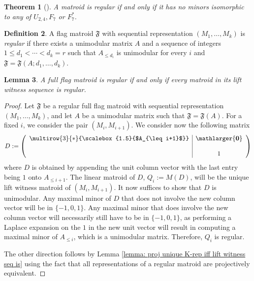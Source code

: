 \documentclass[12pt]{article}
\newtheorem{thm}{Theorem}[section]
\newtheorem{lemma}[thm]{Lemma}
\theoremstyle{definition}
\newtheorem{defn}[thm]{Definition}
\begin{document}
\begin{thm}[{\cite[Theorem~6.6.6]{oxley}}]\label{thm: forbidden minors regularity}
    A matroid is regular if and only if it has no minors isomorphic to any of $U_{2,4}, F_7$ or $F_7^*$.
\end{thm}


\begin{defn}
     A flag matroid $\mathfrak{F}$ with sequential representation $(M_1, \dots, M_k)$ is \emph{regular} if there exists a unimodular matrix $A$ and a sequence of integers $1\leq d_1 < \cdots < d_k = r$ such that  $A_{\leq d_i}$ is unimodular for every $i$ and $\mathfrak{F} = \mathfrak{F}(A; d_1, \dots, d_k)$.
\end{defn}
 

\begin{lemma}\label{lemma: regular iff lift witness is}
    A full flag matroid is regular if and only if every matroid in its lift witness sequence is regular. 
\end{lemma}
\begin{proof}
    Let $\mathfrak{F}$ be a regular full flag matroid with sequential representation $(M_1, \dots, M_k)$, and let $A$ be a unimodular matrix such that $\mathfrak{F} = \mathfrak{F}(A)$. For a fixed $i$, we consider the pair $(M_i, M_{i+1})$. We consider now the following matrix
    \begin{equation*}
        D:= \begin{pmatrix}
            \begin{array}{c|c}
                \multirow{3}{*}{\scalebox{1.5}{$A_{\leq i+1}$}} & \mathlarger{\textbf{0}} \\
                 & \\
                & \textbf{$1$}
            \end{array}
        \end{pmatrix}
    \end{equation*}
    where $D$ is obtained by appending the unit column vector with the last entry being $1$ onto $A_{\leq i+1}$. The linear matroid of $D$, $Q_i := M(D)$, will be the unique lift witness matroid of $(M_i, M_{i+1})$. It now suffices to show that $D$ is unimodular. Any maximal minor of $D$ that does not involve the new column vector will be in $\{-1, 0, 1\}$. Any maximal minor that does involve the new column vector will necessarily still have to be in $\{-1, 0, 1\}$, as performing a Laplace expansion on the $1$ in the new unit vector will result in computing a maximal minor of $A_{\leq i}$, which is a unimodular matrix. Therefore, $Q_i$ is regular. 

    The other direction follows by Lemma \ref{lemma: proj unique K-rep iff lift witness seq is} using the fact that all representations of a regular matroid are projectively equivalent\cite[Proposition 6.6.5]{oxley}. 
\end{proof}
\end{document}
